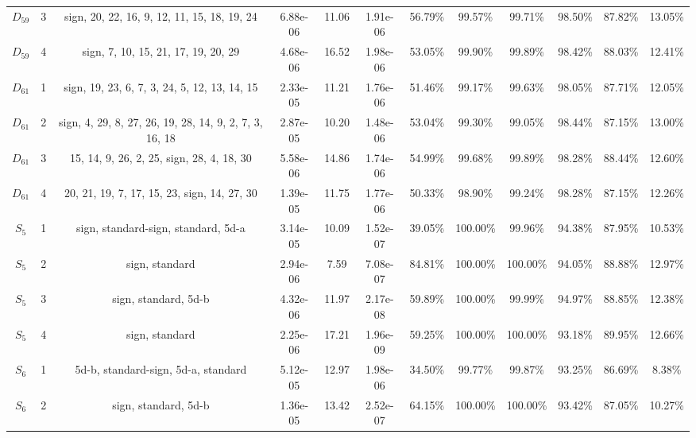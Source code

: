 \begin{tabular}{cccccccccccc}
 $D_{59}$ &    3 &            sign, 20, 22, 16, 9, 12, 11, 15, 18, 19, 24 &  6.88e-06 &     11.06 &  1.91e-06 &   56.79\% &   99.57\% &   99.71\% &   98.50\% & 87.82\% &            13.05\% \\
 $D_{59}$ &    4 &                    sign, 7, 10, 15, 21, 17, 19, 20, 29 &  4.68e-06 &     16.52 &  1.98e-06 &   53.05\% &   99.90\% &   99.89\% &   98.42\% & 88.03\% &            12.41\% \\
 $D_{61}$ &    1 &           sign, 19, 23, 6, 7, 3, 24, 5, 12, 13, 14, 15 &  2.33e-05 &     11.21 &  1.76e-06 &   51.46\% &   99.17\% &   99.63\% &   98.05\% & 87.71\% &            12.05\% \\
 $D_{61}$ &    2 & sign, 4, 29, 8, 27, 26, 19, 28, 14, 9, 2, 7, 3, 16, 18 &  2.87e-05 &     10.20 &  1.48e-06 &   53.04\% &   99.30\% &   99.05\% &   98.44\% & 87.15\% &            13.00\% \\
 $D_{61}$ &    3 &              15, 14, 9, 26, 2, 25, sign, 28, 4, 18, 30 &  5.58e-06 &     14.86 &  1.74e-06 &   54.99\% &   99.68\% &   99.89\% &   98.28\% & 88.44\% &            12.60\% \\
 $D_{61}$ &    4 &            20, 21, 19, 7, 17, 15, 23, sign, 14, 27, 30 &  1.39e-05 &     11.75 &  1.77e-06 &   50.33\% &   98.90\% &   99.24\% &   98.28\% & 87.15\% &            12.26\% \\
  $S_{5}$ &    1 &                    sign, standard-sign, standard, 5d-a &  3.14e-05 &     10.09 &  1.52e-07 &   39.05\% &  100.00\% &   99.96\% &   94.38\% & 87.95\% &            10.53\% \\
  $S_{5}$ &    2 &                                         sign, standard &  2.94e-06 &      7.59 &  7.08e-07 &   84.81\% &  100.00\% &  100.00\% &   94.05\% & 88.88\% &            12.97\% \\
  $S_{5}$ &    3 &                                   sign, standard, 5d-b &  4.32e-06 &     11.97 &  2.17e-08 &   59.89\% &  100.00\% &   99.99\% &   94.97\% & 88.85\% &            12.38\% \\
  $S_{5}$ &    4 &                                         sign, standard &  2.25e-06 &     17.21 &  1.96e-09 &   59.25\% &  100.00\% &  100.00\% &   93.18\% & 89.95\% &            12.66\% \\
  $S_{6}$ &    1 &                    5d-b, standard-sign, 5d-a, standard &  5.12e-05 &     12.97 &  1.98e-06 &   34.50\% &   99.77\% &   99.87\% &   93.25\% & 86.69\% &             8.38\% \\
  $S_{6}$ &    2 &                                   sign, standard, 5d-b &  1.36e-05 &     13.42 &  2.52e-07 &   64.15\% &  100.00\% &  100.00\% &   93.42\% & 87.05\% &            10.27\% \\

\end{tabular}
